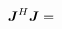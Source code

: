 \documentclass[useAMS,usenatbib]{mn2e}
\makeatletter
\newcommand{\mat}[1]{{\bmath{#1}}}
\newcommand{\JJ}{\mat{J}} %
\newcommand{\Matrix}[2]{\left [ \begin{array}{@{}#1@{}}#2\end{array} \right ]}
\newcommand{\Stack}[1]{\begin{array}{@{}c@{}}#1\end{array}}
\numberwithin{equation}{section} %
\providecommand{\DIFdelbegin}{} %
\providecommand{\DIFdelend}{} %
\makeatother
\begin{document}


\DIFdelend \begin{equation}
\label{eq:JHJ:DI}
\JJ^H \JJ = 
\DIFdelbegin %
\end{equation}%
\end{document}
